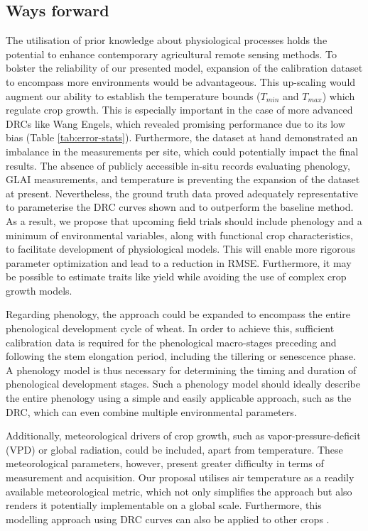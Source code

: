 \subsection{Ways forward}

The utilisation of prior knowledge about physiological processes holds the potential to enhance contemporary agricultural remote sensing methods. To bolster the reliability of our presented model, expansion of the calibration dataset to encompass more environments would be advantageous. This up-scaling would augment our ability to establish the temperature bounds ($T_{min}$ and $T_{max}$) which regulate crop growth. This is especially important in the case of more advanced \gls{DRC}s like Wang Engels, which revealed promising performance due to its low bias (Table \ref{tab:error-stats}). Furthermore, the dataset at hand demonstrated an imbalance in the measurements per site, which could potentially impact the final results. The absence of publicly accessible in-situ records evaluating phenology, \gls{GLAI} measurements, and temperature is preventing the expansion of the dataset at present. Nevertheless, the ground truth data proved adequately representative to parameterise the \gls{DRC} curves shown and to outperform the baseline method. As a result, we propose that upcoming field trials should include phenology and a minimum of environmental variables, along with functional crop characteristics, to facilitate development of physiological models. This will enable more rigorous parameter optimization and lead to a reduction in \gls{RMSE}. Furthermore, it may be possible to estimate traits like yield while avoiding the use of complex crop growth models.

Regarding phenology, the approach could be expanded to encompass the entire phenological development cycle of wheat. In order to achieve this, sufficient calibration data is required for the phenological macro-stages preceding and following the stem elongation period, including the tillering or senescence phase. A phenology model is thus necessary for determining the timing and duration of phenological development stages. Such a phenology model should ideally describe the entire phenology using a simple and easily applicable approach, such as the \gls{DRC}, which can even combine multiple environmental parameters.

Additionally, meteorological drivers of crop growth, such as vapor-pressure-deficit (VPD) or global radiation, could be included, apart from temperature. These meteorological parameters, however, present greater difficulty in terms of measurement and acquisition. Our proposal utilises air temperature as a readily available meteorological metric, which not only simplifies the approach but also renders it potentially implementable on a global scale. Furthermore, this modelling approach using \gls{DRC} curves can also be applied to other crops \citep{parent_temperature_2012, roth_field_2023}.